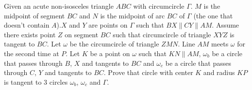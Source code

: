 Given an acute non-isosceles triangle $ABC$ with circumcircle $\Gamma$. $M$ is the midpoint of segment $BC$ and $N$ is the midpoint of arc $BC$ of $\Gamma$ (the one that doesn't contain $A$).$X$ and $Y$ are points on $\Gamma$ such that $BX\parallel CY\parallel AM$. Assume there exists point $Z$ on segment $BC$ such that circumcircle of triangle $XYZ$ is tangent to $BC$. Let $\omega$ be the circumcircle of triangle $ZMN$. Line $AM$ meets $\omega$ for the second time at $P$. Let $K$ be a point on $\omega$ such that $KN\parallel AM$,  $\omega_b$ be a circle that passes through $B$,  $X$ and tangents to $BC$ and $\omega_c$ be a circle that passes through $C$,  $Y$ and tangents to $BC$. Prove that circle with center $K$ and radius $KP$ is tangent to 3 circles $\omega_b$,  $\omega_c$ and $\Gamma$.